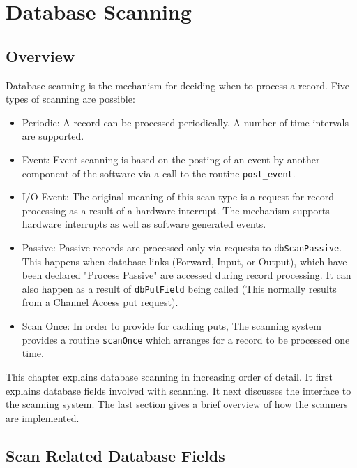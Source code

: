 \chapter{Database Scanning}

\section{Overview}

Database scanning is the mechanism for deciding when to process a record. Five types of scanning are possible:

\begin{itemize}\item {}Periodic:  A record can be processed periodically. A number of time intervals are supported.

\item {}Event:  Event scanning is based on the posting of an event by another component of the software via a call to the 
routine \verb|post_event|.

\item {}I/O Event:  The original meaning of this scan type is a request for record processing as a result of a hardware 
interrupt. The mechanism supports hardware interrupts as well as software generated events.

\item {}Passive:  Passive records are processed only via requests to \verb|dbScanPassive|. This happens when database links 
(Forward, Input, or Output), which have been declared "Process Passive" are accessed during record processing. It 
can also happen as a result of \verb|dbPutField| being called (This normally results from a Channel Access put 
request).

\item {}Scan Once:  In order to provide for caching puts, The scanning system provides a routine \verb|scanOnce| which 
arranges for a record to be processed one time.

\end{itemize}This chapter explains database scanning in increasing order of detail. It first explains database fields involved with 
scanning. It next discusses the interface to the scanning system. The last section gives a brief overview of how the 
scanners are implemented. 

\section{Scan Related Database Fields}

